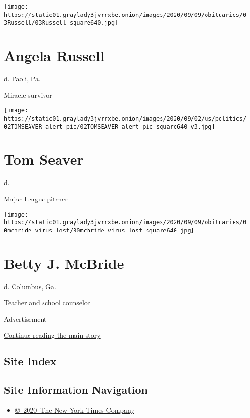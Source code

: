 \texttt{[image: https://static01.graylady3jvrrxbe.onion/images/2020/09/09/obituaries/03Russell/03Russell-square640.jpg]}

\hypertarget{angela-russell}{%
\section{Angela Russell}\label{angela-russell}}

d. Paoli, Pa.

Miracle survivor

\texttt{[image: https://static01.graylady3jvrrxbe.onion/images/2020/09/02/us/politics/02TOMSEAVER-alert-pic/02TOMSEAVER-alert-pic-square640-v3.jpg]}

\hypertarget{tom-seaver}{%
\section{Tom Seaver}\label{tom-seaver}}

d.

Major League pitcher

\texttt{[image: https://static01.graylady3jvrrxbe.onion/images/2020/09/09/obituaries/00mcbride-virus-lost/00mcbride-virus-lost-square640.jpg]}

\hypertarget{betty-j-mcbride}{%
\section{Betty J. McBride}\label{betty-j-mcbride}}

d. Columbus, Ga.

Teacher and school counselor

Advertisement

\protect\hyperlink{after-bottom}{Continue reading the main story}

\hypertarget{site-index}{%
\subsection{Site Index}\label{site-index}}

\hypertarget{site-information-navigation}{%
\subsection{Site Information
Navigation}\label{site-information-navigation}}

\begin{itemize}
\tightlist
\item
  \href{https://help.nytimes3xbfgragh.onion/hc/en-us/articles/115014792127-Copyright-notice}{©~2020~The
  New York Times Company}
\end{itemize}

